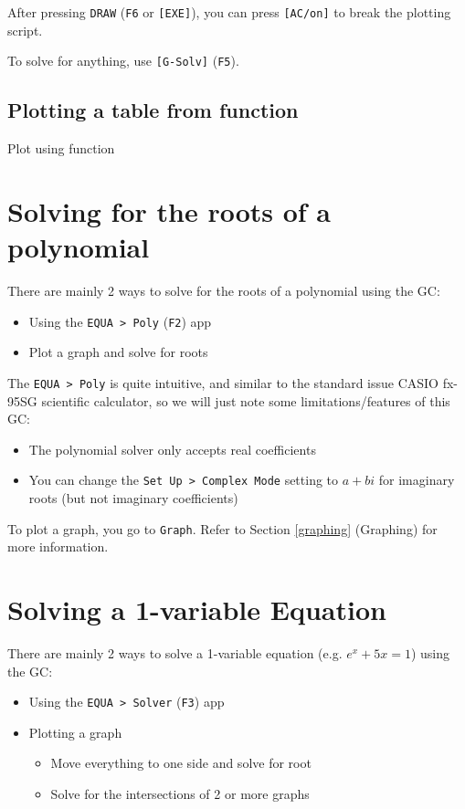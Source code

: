 \documentclass[a5paper,draft]{memoir}
\def\code#1{\texttt{#1}}
\begin{document}
After pressing \code{DRAW} (\code{F6} or \code{[EXE]}), you can press \code{[AC/on]} to break the plotting script.

To solve for anything, use \code{[G-Solv]} (\code{F5}).

\subsection{Plotting a table from function} \label{plottable}
Plot using function


\section{Solving for the roots of a polynomial}
There are mainly 2 ways to solve for the roots of a polynomial using the GC:
\begin{itemize}
	\item Using the \code{EQUA > Poly} (\code{F2}) app
	\item Plot a graph and solve for roots
\end{itemize}

The \code{EQUA > Poly} is quite intuitive, and similar to the standard issue CASIO fx-95SG scientific calculator, so we will just note some limitations/features of this GC:
\begin{itemize}
	\item The polynomial solver only accepts real coefficients
	\item You can change the \code{Set Up > Complex Mode} setting to \code{$a+bi$} for imaginary roots (but not imaginary coefficients)
\end{itemize}

To plot a graph, you go to \code{Graph}. Refer to Section \ref{graphing} (Graphing) for more information.

\section{Solving a 1-variable Equation}
There are mainly 2 ways to solve a 1-variable equation (e.g. $e^x + 5x = 1$) using the GC:
\begin{itemize}
	\item Using the \code{EQUA > Solver} (\code{F3}) app
	\item Plotting a graph
	\begin{itemize}
		\item Move everything to one side and solve for root
		\item Solve for the intersections of 2 or more graphs
	\end{itemize}
\end{itemize}
\end{document}
